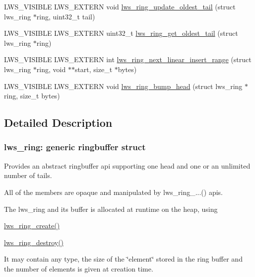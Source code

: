 \begin{DoxyCompactItemize}
\item 
L\+W\+S\+\_\+\+V\+I\+S\+I\+B\+LE L\+W\+S\+\_\+\+E\+X\+T\+E\+RN void \hyperlink{group__lws__ring_gac4ec0634b0a901c4cc9cad33fcd7273b}{lws\+\_\+ring\+\_\+update\+\_\+oldest\+\_\+tail} (struct lws\+\_\+ring $\ast$ring, uint32\+\_\+t tail)
\item 
L\+W\+S\+\_\+\+V\+I\+S\+I\+B\+LE L\+W\+S\+\_\+\+E\+X\+T\+E\+RN uint32\+\_\+t \hyperlink{group__lws__ring_ga410b651d0668809dcf6e3621edce2794}{lws\+\_\+ring\+\_\+get\+\_\+oldest\+\_\+tail} (struct lws\+\_\+ring $\ast$ring)
\item 
L\+W\+S\+\_\+\+V\+I\+S\+I\+B\+LE L\+W\+S\+\_\+\+E\+X\+T\+E\+RN int \hyperlink{group__lws__ring_ga7b61910109bce5a64a9cd411377ae7b1}{lws\+\_\+ring\+\_\+next\+\_\+linear\+\_\+insert\+\_\+range} (struct lws\+\_\+ring $\ast$ring, void $\ast$$\ast$start, size\+\_\+t $\ast$bytes)
\item 
L\+W\+S\+\_\+\+V\+I\+S\+I\+B\+LE L\+W\+S\+\_\+\+E\+X\+T\+E\+RN void \hyperlink{group__lws__ring_gaef516991b6b0268a639f76a01def2f87}{lws\+\_\+ring\+\_\+bump\+\_\+head} (struct lws\+\_\+ring $\ast$ring, size\+\_\+t bytes)
\end{DoxyCompactItemize}


\subsection{Detailed Description}
\subsubsection*{lws\+\_\+ring\+: generic ringbuffer struct}

Provides an abstract ringbuffer api supporting one head and one or an unlimited number of tails.

All of the members are opaque and manipulated by lws\+\_\+ring\+\_\+...() apis.

The lws\+\_\+ring and its buffer is allocated at runtime on the heap, using


\begin{DoxyItemize}
\item \hyperlink{group__lws__ring_ga3c9d92d25a17879f77e13eb481c5a82d}{lws\+\_\+ring\+\_\+create()}
\item \hyperlink{group__lws__ring_ga0e671dbbb18af91d23e78026d49bc6e2}{lws\+\_\+ring\+\_\+destroy()}
\end{DoxyItemize}

It may contain any type, the size of the \char`\"{}element\char`\"{} stored in the ring buffer and the number of elements is given at creation time.

